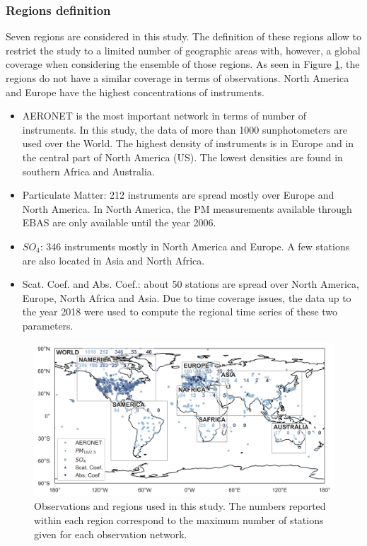 \documentclass[journal abbreviation, manuscript]{copernicus}
\begin{document}
\subsubsection{Regions definition}
Seven regions are considered in this study. The definition of these regions allow to restrict the study to a limited number of geographic areas with, however, a global coverage when considering the ensemble of those regions. As seen in Figure \ref{fig:map_obs}, the regions do not have a similar coverage in terms of observations. North America and Europe have the highest concentrations of instruments.
\begin{itemize}
 \item AERONET is the most important network in terms of number of instruments. In this study, the data of more than 1000 sunphotometers are used over the World. The highest density of instruments is in Europe and in the central part of North America (US). The lowest densities are found in southern Africa and Australia.
 \item Particulate Matter: 212 instruments are spread mostly over Europe and North America. In North America, the PM measurements available through EBAS are only available until the year 2006.
 \item $SO_{4}$: 346 instruments mostly in North America and Europe. A few stations are also located in Asia and North Africa.
 \item Scat. Coef. and Abs. Coef.: about 50 stations are spread over North America, Europe, North Africa and Asia. Due to time coverage issues, the data up to the year 2018 were used to compute the regional time series of these two parameters.
\end{itemize}

\begin{figure}
 \includegraphics[width=12cm]{../scripts/figs/maps/av_obs.png}
 \caption{Observations and regions used in this study. The numbers reported within each region correspond to the maximum number of stations given for each observation network.}
 \label{fig:map_obs}
\end{figure}
\end{document}
